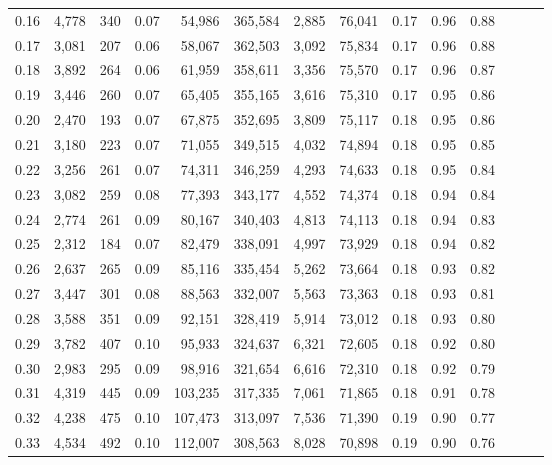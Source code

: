 \begin{tabular}{rrrrrrrrrrrrrr}
0.16 &   4,778 &    340 &  0.07 &   54,986 &  365,584 &   2,885 &  76,041 &  0.17 &  0.96 &      0.88 \\
0.17 &   3,081 &    207 &  0.06 &   58,067 &  362,503 &   3,092 &  75,834 &  0.17 &  0.96 &      0.88 \\
0.18 &   3,892 &    264 &  0.06 &   61,959 &  358,611 &   3,356 &  75,570 &  0.17 &  0.96 &      0.87 \\
0.19 &   3,446 &    260 &  0.07 &   65,405 &  355,165 &   3,616 &  75,310 &  0.17 &  0.95 &      0.86 \\
0.20 &   2,470 &    193 &  0.07 &   67,875 &  352,695 &   3,809 &  75,117 &  0.18 &  0.95 &      0.86 \\
0.21 &   3,180 &    223 &  0.07 &   71,055 &  349,515 &   4,032 &  74,894 &  0.18 &  0.95 &      0.85 \\
0.22 &   3,256 &    261 &  0.07 &   74,311 &  346,259 &   4,293 &  74,633 &  0.18 &  0.95 &      0.84 \\
0.23 &   3,082 &    259 &  0.08 &   77,393 &  343,177 &   4,552 &  74,374 &  0.18 &  0.94 &      0.84 \\
0.24 &   2,774 &    261 &  0.09 &   80,167 &  340,403 &   4,813 &  74,113 &  0.18 &  0.94 &      0.83 \\
0.25 &   2,312 &    184 &  0.07 &   82,479 &  338,091 &   4,997 &  73,929 &  0.18 &  0.94 &      0.82 \\
0.26 &   2,637 &    265 &  0.09 &   85,116 &  335,454 &   5,262 &  73,664 &  0.18 &  0.93 &      0.82 \\
0.27 &   3,447 &    301 &  0.08 &   88,563 &  332,007 &   5,563 &  73,363 &  0.18 &  0.93 &      0.81 \\
0.28 &   3,588 &    351 &  0.09 &   92,151 &  328,419 &   5,914 &  73,012 &  0.18 &  0.93 &      0.80 \\
0.29 &   3,782 &    407 &  0.10 &   95,933 &  324,637 &   6,321 &  72,605 &  0.18 &  0.92 &      0.80 \\
0.30 &   2,983 &    295 &  0.09 &   98,916 &  321,654 &   6,616 &  72,310 &  0.18 &  0.92 &      0.79 \\
0.31 &   4,319 &    445 &  0.09 &  103,235 &  317,335 &   7,061 &  71,865 &  0.18 &  0.91 &      0.78 \\
0.32 &   4,238 &    475 &  0.10 &  107,473 &  313,097 &   7,536 &  71,390 &  0.19 &  0.90 &      0.77 \\
0.33 &   4,534 &    492 &  0.10 &  112,007 &  308,563 &   8,028 &  70,898 &  0.19 &  0.90 &      0.76 \\

\end{tabular}
